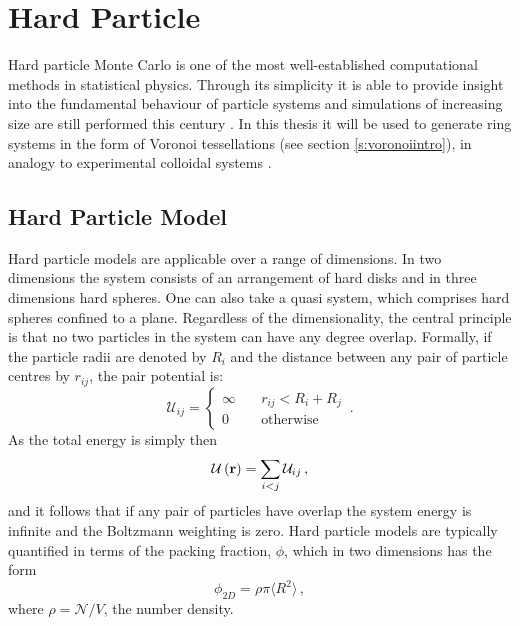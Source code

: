 \section{Hard Particle \mc}
\label{s:hardparticlemc}

Hard particle Monte Carlo is one of the most well\--established computational methods in statistical physics.
Through its simplicity it is able to provide insight into the fundamental behaviour of particle systems and simulations of increasing size are still performed this century \cite{Isobe2016,Bernard2009,Anderson2013,Isobe2015}.
In this thesis it will be used to generate ring systems in the form of Voronoi tessellations (see section \ref{s:voronoiintro}), in analogy to experimental colloidal systems \cite{Thorneywork2017}.

\subsection{Hard Particle Model}
\label{s:hardparticlemodelintro}

Hard particle models are applicable over a range of dimensions.
In two dimensions the system consists of an arrangement of hard disks and in three dimensions hard spheres.
One can also take a quasi \td{} system, which comprises hard spheres confined to a plane.
Regardless of the dimensionality, the central principle is that no two particles in the system can have any degree overlap.
Formally, if the particle radii are denoted by $R_i$ and the distance between any pair of particle centres by $r_{ij}$, the pair potential is:
\begin{equation}
	\mathcal{U}_{ij} = \begin{cases}
	\infty \quad &r_{ij}<R_i+R_j \\
	0 \quad &\text{otherwise} %
	\end{cases} \,.
\end{equation}
As the total energy is simply then
\begin{equation}
	\mathcal{U}\left(\mathbf{r}\right) = \sum_{i<j} \mathcal{U}_{ij}\,,
\end{equation}
and it follows that if any pair of particles have overlap the system energy is infinite and the Boltzmann weighting is zero.
Hard particle models are typically quantified in terms of the packing fraction, $\phi$, which in two dimensions has the form
\begin{equation}
	\label{eq:packingfraction}
	\phi_{2D} = \rho\pi\langle R^2\rangle\,,
\end{equation}
where $\rho=\mathcal{N}/{V}$, the number density.

